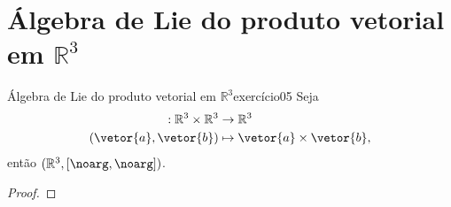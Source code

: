 \section[Álgebra de Lie do produto vetorial em R³]{Álgebra de Lie do produto vetorial em \(\mathbb{R}^3\)}
\begin{proposition}{Álgebra de Lie do produto vetorial em \(\mathbb{R}^3\)}{exercício05}
    Seja
    \begin{align*}
        [\noarg, \noarg] : \mathbb{R}^3 \times \mathbb{R}^3 &\to \mathbb{R}^3\\
                                      (\vetor{a},\vetor{b}) &\mapsto \vetor{a}\times \vetor{b},
    \end{align*}
    então \((\mathbb{R}^3, [\noarg, \noarg])\).
\end{proposition}
\begin{proof}
\end{proof}
